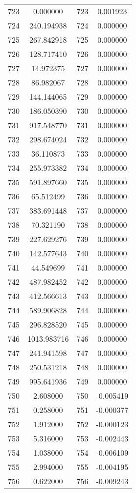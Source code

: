 \documentclass[12pt]{article}
\begin{document}
\begin{longtable}{@{}cccc@{}}
723 & 0.000000 & 723 & 0.001923 \\
724 & 240.194938 & 724 & 0.000000 \\
725 & 267.842918 & 725 & 0.000000 \\
726 & 128.717410 & 726 & 0.000000 \\
727 & 14.972375 & 727 & 0.000000 \\
728 & 86.982067 & 728 & 0.000000 \\
729 & 144.144065 & 729 & 0.000000 \\
730 & 186.050390 & 730 & 0.000000 \\
731 & 917.548770 & 731 & 0.000000 \\
732 & 298.674024 & 732 & 0.000000 \\
733 & 36.110873 & 733 & 0.000000 \\
734 & 255.973382 & 734 & 0.000000 \\
735 & 591.897660 & 735 & 0.000000 \\
736 & 65.512499 & 736 & 0.000000 \\
737 & 383.691448 & 737 & 0.000000 \\
738 & 70.321190 & 738 & 0.000000 \\
739 & 227.629276 & 739 & 0.000000 \\
740 & 142.577643 & 740 & 0.000000 \\
741 & 44.549699 & 741 & 0.000000 \\
742 & 487.982452 & 742 & 0.000000 \\
743 & 412.566613 & 743 & 0.000000 \\
744 & 589.906828 & 744 & 0.000000 \\
745 & 296.828520 & 745 & 0.000000 \\
746 & 1013.983716 & 746 & 0.000000 \\
747 & 241.941598 & 747 & 0.000000 \\
748 & 250.531218 & 748 & 0.000000 \\
749 & 995.641936 & 749 & 0.000000 \\
750 & 2.608000 & 750 & -0.005419 \\
751 & 0.258000 & 751 & -0.000377 \\
752 & 1.912000 & 752 & -0.000123 \\
753 & 5.316000 & 753 & -0.002443 \\
754 & 1.038000 & 754 & -0.006109 \\
755 & 2.994000 & 755 & -0.004195 \\
756 & 0.622000 & 756 & -0.009243 \\

\end{longtable}
\end{document}

